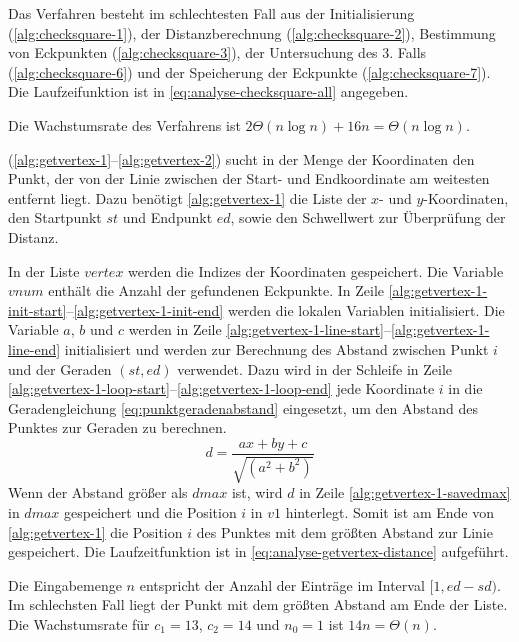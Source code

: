 Das Verfahren  besteht im schlechtesten Fall aus der Initialisierung
 (\autoref{alg:checksquare-1}), der Distanzberechnung (\autoref{alg:checksquare-2}), Bestimmung von Eckpunkten
 (\autoref{alg:checksquare-3}), der Untersuchung des 3. Falls (\autoref{alg:checksquare-6}) und der Speicherung der
 Eckpunkte (\autoref{alg:checksquare-7}). Die Laufzeifunktion ist in \autoref{eq:analyse-checksquare-all} angegeben.

Die Wachstumsrate des Verfahrens ist $2\Theta(n \log n) + 16n = \Theta(n \log n)$.

 (\autoref{alg:getvertex-1}--\autoref{alg:getvertex-2}) sucht in der Menge der Koordinaten den
 Punkt, der von der Linie zwischen der Start- und Endkoordinate am weitesten entfernt liegt. Dazu benötigt
 \autoref{alg:getvertex-1} die Liste der $x$- und $y$-Koordinaten, den Startpunkt $\mathit{st}$ und Endpunkt
 $\mathit{ed}$, sowie den Schwellwert zur Überprüfung der Distanz.

In der Liste $\mathit{vertex}$ werden die Indizes der Koordinaten gespeichert. Die Variable $\mathit{vnum}$ enthält die
 Anzahl der gefundenen Eckpunkte. In Zeile \ref{alg:getvertex-1-init-start}--\ref{alg:getvertex-1-init-end} werden die
 lokalen Variablen initialisiert. Die Variable $a$, $b$ und $c$ werden in Zeile
 \ref{alg:getvertex-1-line-start}--\ref{alg:getvertex-1-line-end} initialisiert und werden zur Berechnung des Abstand
 zwischen Punkt $i$ und der Geraden $(\mathit{st},\mathit{ed})$ verwendet. Dazu wird in der Schleife in Zeile
 \ref{alg:getvertex-1-loop-start}--\ref{alg:getvertex-1-loop-end} jede Koordinate $i$ in die Geradengleichung
 \autoref{eq:punktgeradenabstand} eingesetzt, um den Abstand des Punktes zur Geraden zu berechnen.
\begin{equation}
	\label{eq:punktgeradenabstand}
	d = \frac{\mathit{ax} + \mathit{by} + c}{\sqrt{(a^2 + b^2)}}
\end{equation}
Wenn der Abstand größer als $\mathit{dmax}$ ist, wird $d$ in Zeile \ref{alg:getvertex-1-savedmax} in $\mathit{dmax}$
 gespeichert und die Position $i$ in $\mathit{v1}$ hinterlegt. Somit ist am Ende von \autoref{alg:getvertex-1} die
 Position $i$ des Punktes mit dem größten Abstand zur Linie gespeichert. Die Laufzeitfunktion ist in
 \autoref{eq:analyse-getvertex-distance} aufgeführt.

Die Eingabemenge $n$ entspricht der Anzahl der Einträge im Interval $[1,\mathit{ed}-\mathit{sd})$. Im schlechsten Fall
 liegt der Punkt mit dem größten Abstand am Ende der Liste. Die Wachstumsrate für $c_{1} = 13$, $c_{2} = 14$ und
 $n_{0} = 1$ ist $14n = \Theta(n)$.

